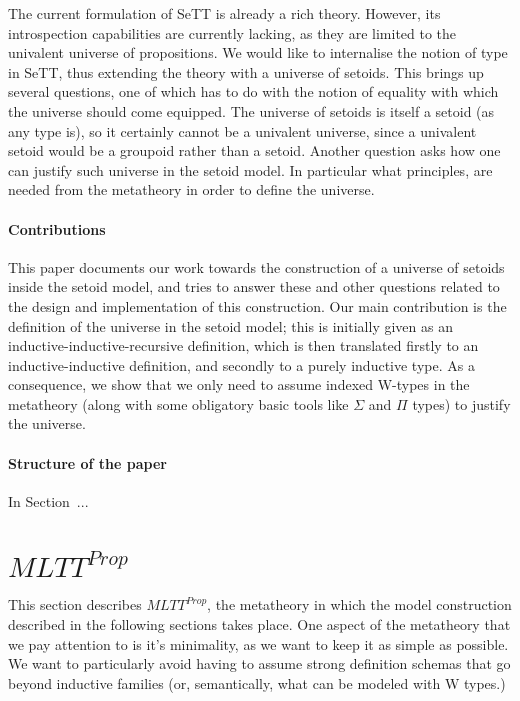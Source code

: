 \documentclass{easychair}
\begin{document}
The current formulation of SeTT is already a rich theory. However, its
introspection capabilities are currently lacking, as they are limited to the
univalent universe of propositions. We would like to internalise the notion of
type in SeTT, thus extending the theory with a universe of setoids.
%
This brings up several questions, one of which has to do with the notion of
equality with which the universe should come equipped. The universe of setoids
is itself a setoid (as any type is), so it certainly cannot be a univalent
universe, since a univalent setoid would be a groupoid rather than a setoid.
%
Another question asks how one can justify such universe in the setoid model. In
particular what principles, are needed from the metatheory in order to define
the universe.

\paragraph{Contributions}

This paper documents our work towards the construction of a universe of setoids
inside the setoid model, and tries to answer these and other questions related
to the design and implementation of this construction. Our main contribution is
the definition of the universe in the setoid model; this is initially given as
an inductive-inductive-recursive definition, which is then translated firstly to
an inductive-inductive definition, and secondly to a purely inductive type. As a
consequence, we show that we only need to assume indexed W-types in the
metatheory (along with some obligatory basic tools like $\Sigma$ and $\Pi$
types) to justify the universe.

\paragraph{Structure of the paper}

In Section~\label{sec:metatheory}...

\section{$MLTT^{Prop}$}\label{metatheory}

This section describes $MLTT^{Prop}$, the metatheory in which the model
construction described in the following sections takes place. One aspect of the
metatheory that we pay attention to is it's minimality, as we want to keep it as
simple as possible. We want to particularly avoid having to assume strong
definition schemas that go beyond inductive families (or, semantically, what can
be modeled with W types.)
\end{document}
